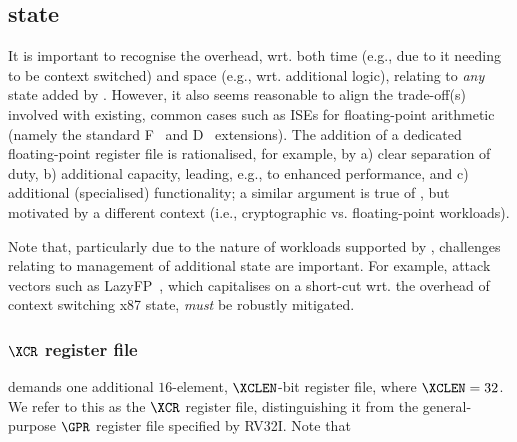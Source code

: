 \subsection{\XCID state}
\label{sec:spec:state}

It is important to recognise the overhead, wrt. both 
time  (e.g., due to it needing to be context switched) 
and 
space (e.g., wrt. additional logic),
relating to {\em any} state added by \XCID.
However, it also seems reasonable to align the trade-off(s) involved with 
existing, common cases such as ISEs for floating-point arithmetic (namely
the standard 
F~\cite[Section 8]{SCARV:RV:ISA:I:17}
and
D~\cite[Section 9]{SCARV:RV:ISA:I:17}
extensions).  The addition of a dedicated floating-point register file is
rationalised, for example, by
a) clear separation of duty,
b) additional capacity, leading, e.g., to enhanced performance,
   and
c) additional (specialised) functionality;
a similar argument is true of \XCID, but motivated by a different context
(i.e., cryptographic vs. floating-point workloads).

Note that, particularly due to the nature of workloads supported by \XCID,
challenges relating to management of additional state are important.  For
example, attack vectors such as 
LazyFP~\cite{SCARV:StePre:18}, 
which capitalises on a short-cut wrt. the overhead of context switching
x87 state, {\em must} be robustly mitigated.


\subsubsection{$\XCR$ register file}
\label{sec:spec:state:xcr}

\XCID 
demands one additional 
$16$-element, $\XCLEN$-bit register file,
where $\XCLEN = 32$.
We refer to this as the $\XCR$ register file, distinguishing it from the
general-purpose $\GPR$ register file specified by RV32I.
Note that

